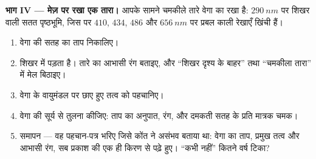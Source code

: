 \begin{problem}
\medskip
\noindent\textbf{भाग IV --- मेज़ पर रखा एक तारा।}
आपके सामने चमकीले तारे वेगा का  रखा है: $\qty{290}{nm}$ पर
शिखर वाली सतत पृष्ठभूमि, जिस पर $410$, $434$, $486$ और $\qty{656}{nm}$ पर
प्रबल काली रेखाएँ खिंची हैं।
\begin{enumerate}[resume]
  \item वेगा की सतह का ताप निकालिए।
  \item शिखर  में पड़ता है। तारे का आभासी रंग बताइए,
        और ``शिखर दृश्य के बाहर'' तथा ``चमकीला तारा'' में मेल बिठाइए।
  \item वेगा के वायुमंडल पर छाए हुए तत्व को पहचानिए।
  \item वेगा की सूर्य से तुलना कीजिए: ताप का अनुपात, रंग, और दमकती सतह
        के प्रति मात्रक चमक।
  \item समापन --- वह पहचान-पत्र भरिए जिसे कोंत ने असंभव बताया था:
        वेगा का ताप, प्रमुख तत्व और आभासी रंग, सब प्रकाश की एक ही किरण
        से पढ़े हुए। ``कभी नहीं'' कितने वर्ष टिका?
\end{enumerate}
\end{problem}
